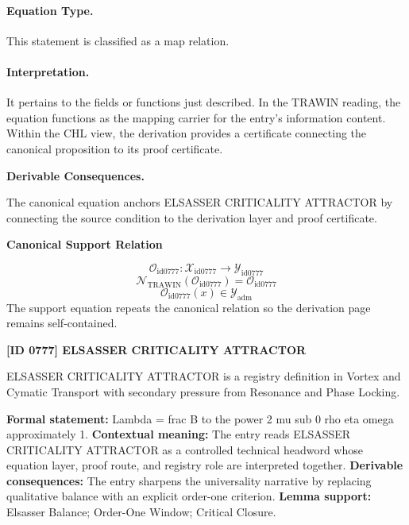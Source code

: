 \paragraph{Equation Type.}
This statement is classified as a map relation.

\paragraph{Interpretation.}
It pertains to the fields or functions just described. In the TRAWIN reading, the equation functions as the mapping carrier for the entry’s information content. Within the CHL view, the derivation provides a certificate connecting the canonical proposition to its proof certificate.

\par\vspace{0.35em}
\noindent\textbf{Derivable Consequences.}\quad
\begingroup
\footnotesize
\raggedright
The canonical equation anchors ELSASSER CRITICALITY ATTRACTOR by connecting the source condition to the derivation layer and proof certificate.
\par\endgroup

\noindent\textbf{Canonical Support Relation}\par
\[
\mathcal{O}_{\mathrm{id0777}}:\mathcal{X}_{\mathrm{id0777}}\longrightarrow\mathcal{Y}_{\mathrm{id0777}}
\]
\[
\mathcal{N}_{\mathrm{TRAWIN}}(\mathcal{O}_{\mathrm{id0777}})=\mathcal{O}_{\mathrm{id0777}}
\]
\[
\mathcal{O}_{\mathrm{id0777}}(x)\in\mathcal{Y}_{\mathrm{adm}}
\]
\noindent The support equation repeats the canonical relation so the derivation page remains self-contained.\par

\clearpage
\noindent\textbf{[ID 0777] ELSASSER CRITICALITY ATTRACTOR}\par
\vspace{0.35em}
\begingroup\small
{}
ELSASSER CRITICALITY ATTRACTOR is a registry definition in Vortex and Cymatic Transport with secondary pressure from Resonance and Phase Locking.

\begingroup\footnotesize\setlength{\emergencystretch}{3em}\sloppy
\textbf{Formal statement:} Lambda = frac B to the power 2 mu sub 0 rho eta omega approximately 1. \textbf{Contextual meaning:} The entry reads ELSASSER CRITICALITY ATTRACTOR as a controlled technical headword whose equation layer, proof route, and registry role are interpreted together. \textbf{Derivable consequences:} The entry sharpens the universality narrative by replacing qualitative balance with an explicit order-one criterion. \textbf{Lemma support:} Elsasser Balance; Order-One Window; Critical Closure.\par
\endgroup

